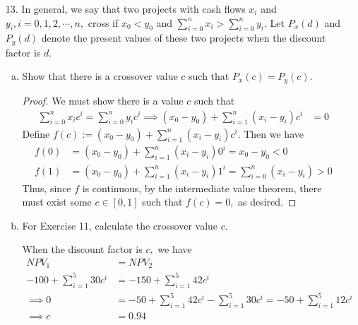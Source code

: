 \documentclass{article}
\begin{document}
\begin{itemize}
	\item[13.] In general, we say that two projects with cash flows $x_i$ and $y_i, i=0, 1, 2, \cdots, n,$ cross if $x_0<y_0$ and $\sum_{i=0}^{n} x_i>\sum_{i=0}^{n} y_i.$ Let $P_x(d)$ and $P_y(d)$ denote the present values of these two projects when the discount factor is $d.$
		\begin{enumerate}[(a)]
			\item Show that there is a crossover value $c$ such that $P_x(c)=P_y(c).$
				\begin{proof}
					We must show there is a value $c$ such that
					\begin{align*}
						\sum_{i=0}^{n} x_ic^i = \sum_{i=0}^{n} y_i c^i \implies (x_0-y_0) + \sum_{i=1}^{n} (x_i-y_i)c^i &= 0	
					\end{align*}
					Define $f(c):=(x_0-y_0) + \sum_{i=1}^{n} (x_i-y_i)c^i.$ Then we have
					\begin{align*}
						f(0) &= (x_0-y_0) + \sum_{i=1}^{n} (x_i-y_i)0^i = x_0-y_0 < 0 \\
						f(1) &= (x_0-y_0) + \sum_{i=1}^{n} (x_i-y_i)1^i = \sum_{i=0}^{n} (x_i-y_i) > 0
					\end{align*}
					Thus, since $f$ is continuous, by the intermediate value theorem, there must exist some $c\in[0, 1]$ such that $f(c)=0,$ as desired.
				\end{proof}

			\item For Exercise 11, calculate the crossover value $c.$
				\begin{soln}
					When the discount factor is $c,$ we have
					\begin{align*}
						NPV_1 &= NPV_2 \\
						-100+\sum_{i=1}^{5}30c^i &= -150 + \sum_{i=1}^{5}42c^i \\
						\implies 0 &= -50+\sum_{i=1}^{5}42c^i - \sum_{i=1}^{5}30c^i = -50+\sum_{i=1}^{5} 12c^i \\
						\implies c &= 0.94
					\end{align*}
				\end{soln}
				
		\end{enumerate}

\end{itemize}
\end{document}
